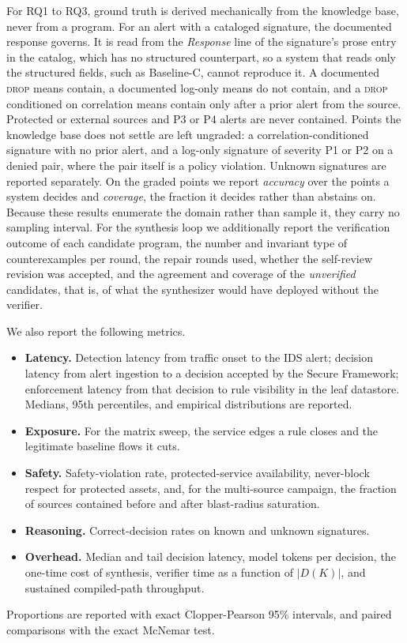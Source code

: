 \documentclass[final,5p]{elsarticle}
\begin{document}
For RQ1 to RQ3, ground truth is derived mechanically from the knowledge base, never from a program. For an alert with a cataloged signature, the documented response governs. It is read from the \emph{Response} line of the signature's prose entry in the catalog, which has no structured counterpart, so a system that reads only the structured fields, such as Baseline-C, cannot reproduce it. A documented \textsc{drop} means contain, a documented log-only means do not contain, and a \textsc{drop} conditioned on correlation means contain only after a prior alert from the source. Protected or external sources and P3 or P4 alerts are never contained. Points the knowledge base does not settle are left ungraded: a correlation-conditioned signature with no prior alert, and a log-only signature of severity P1 or P2 on a denied pair, where the pair itself is a policy violation. Unknown signatures are reported separately. On the graded points we report \emph{accuracy} over the points a system decides and \emph{coverage}, the fraction it decides rather than abstains on. Because these results enumerate the domain rather than sample it, they carry no sampling interval. For the synthesis loop we additionally report the verification outcome of each candidate program, the number and invariant type of counterexamples per round, the repair rounds used, whether the self-review revision was accepted, and the agreement and coverage of the \emph{unverified} candidates, that is, of what the synthesizer would have deployed without the verifier.

We also report the following metrics.
\begin{itemize}[leftmargin=*]
    \item \textbf{Latency.} Detection latency from traffic onset to the IDS alert; decision latency from alert ingestion to a decision accepted by the Secure Framework; enforcement latency from that decision to rule visibility in the leaf datastore. Medians, 95th percentiles, and empirical distributions are reported.
    \item \textbf{Exposure.} For the matrix sweep, the service edges a rule closes and the legitimate baseline flows it cuts.
    \item \textbf{Safety.} Safety-violation rate, protected-service availability, never-block respect for protected assets, and, for the multi-source campaign, the fraction of sources contained before and after blast-radius saturation.
    \item \textbf{Reasoning.} Correct-decision rates on known and unknown signatures.
    \item \textbf{Overhead.} Median and tail decision latency, model tokens per decision, the one-time cost of synthesis, verifier time as a function of $|D(K)|$, and sustained compiled-path throughput.
\end{itemize}
Proportions are reported with exact Clopper-Pearson 95\% intervals, and paired comparisons with the exact McNemar test.
\end{document}
